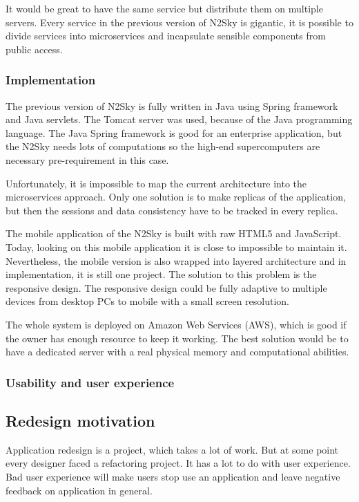 It would be great to have the same service but distribute them on multiple servers. Every service in the previous version of N2Sky is gigantic, it is possible to divide services into microservices and incapsulate sensible components from public access.


\subsubsection{Implementation}\label{Implementation}

The previous version of N2Sky is fully written in Java using Spring framework and Java servlets. The Tomcat server was used, because of the Java programming language. The  Java Spring framework is good for an enterprise application, but the N2Sky needs lots of computations so the high-end supercomputers are necessary pre-requirement in this case. 

Unfortunately, it is impossible to map the current architecture into the microservices approach. Only one solution is to make replicas of the application, but then the sessions and data consistency have to be tracked in every replica. 

The mobile application of the N2Sky is built with raw HTML5 and JavaScript. Today, looking on this mobile application it is close to impossible to maintain it. Nevertheless,  the mobile version is also wrapped into layered architecture and in implementation, it is still one project. The solution to this problem is the responsive design. The responsive design could be fully adaptive to multiple devices from desktop PCs to mobile with a small screen resolution.

The whole system is deployed on Amazon Web Services (AWS), which is good if the owner has enough resource to keep it working. The best solution would be to have a dedicated server with a real physical memory and computational abilities.  


\subsubsection{Usability and user experience}\label{Usabilityanduserexperience}



\subsection{Redesign motivation}\label{Redesignmotivation}

Application redesign is a project, which takes a lot of work. But at some point every designer faced a refactoring project. It has a lot to do with user experience. Bad user experience will make users stop use an application and leave negative feedback on application in general. 

